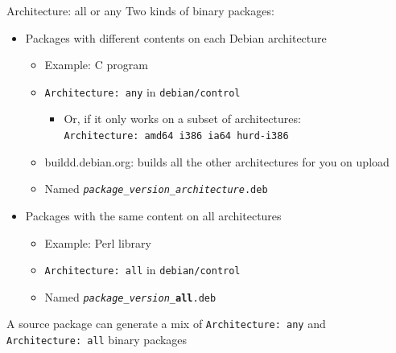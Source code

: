 \documentclass[10pt,final]{beamer}
\begin{document}
\begin{frame}{Architecture: all or any}
  Two kinds of binary packages:
  \hbr
  \begin{itemize}
  \item Packages with different contents on each Debian architecture
    \begin{itemize}
    \item Example: C program
    \item \texttt{Architecture:\ any} in \texttt{debian/control}
      \begin{itemize}
      \item Or, if it only works on a subset of architectures:\\
        \texttt{Architecture:\ amd64 i386 ia64 hurd-i386}
      \end{itemize}
    \item buildd.debian.org: builds all the other architectures for you on upload
    \item Named \texttt{\textsl{package}\_\textsl{version}\_\textsl{architecture}.deb}
    \end{itemize}
    \br
  \item Packages with the same content on all architectures
    \begin{itemize}
    \item Example: Perl library
    \item \texttt{Architecture:\ all} in \texttt{debian/control}
    \item Named \texttt{\textsl{package}\_\textsl{version}\_\textbf{all}.deb}
    \end{itemize}
  \end{itemize}
  \br
  A source package can generate a mix of \texttt{Architecture:\ any} and \texttt{Architecture:\ all} binary packages
\end{frame}
\end{document}
